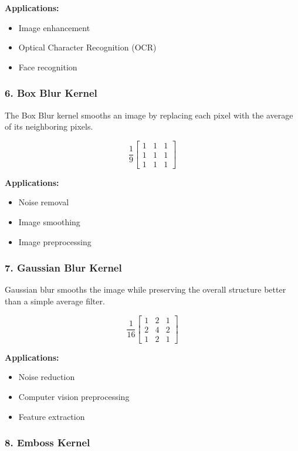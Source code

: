 \documentclass[11pt]{article}
\begin{document}
\textbf{Applications:}
\begin{itemize}
\item Image enhancement
\item Optical Character Recognition (OCR)
\item Face recognition
\end{itemize}

\subsubsection*{6. Box Blur Kernel}

The Box Blur kernel smooths an image by replacing each pixel with the
average of its neighboring pixels.

\[
\frac{1}{9}
\begin{bmatrix}
1 & 1 & 1\\
1 & 1 & 1\\
1 & 1 & 1
\end{bmatrix}
\]

\textbf{Applications:}
\begin{itemize}
\item Noise removal
\item Image smoothing
\item Image preprocessing
\end{itemize}

\subsubsection*{7. Gaussian Blur Kernel}

Gaussian blur smooths the image while preserving the overall structure
better than a simple average filter.

\[
\frac{1}{16}
\begin{bmatrix}
1 & 2 & 1\\
2 & 4 & 2\\
1 & 2 & 1
\end{bmatrix}
\]

\textbf{Applications:}
\begin{itemize}
\item Noise reduction
\item Computer vision preprocessing
\item Feature extraction
\end{itemize}

\subsubsection*{8. Emboss Kernel}
\end{document}
